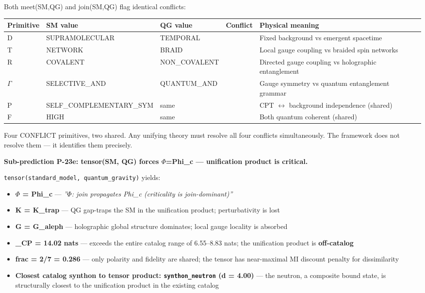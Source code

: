 \documentclass[12pt,a4paper]{article}
\begin{document}
Both meet(SM,QG) and join(SM,QG) flag identical conflicts:

\begin{table}[htbp]
\centering
\small
{}
\begin{tabularx}{\textwidth}{>{\centering\arraybackslash}X >{\centering\arraybackslash}X >{\centering\arraybackslash}X >{\centering\arraybackslash}X >{\centering\arraybackslash}X}
\toprule
\rowcolor{gray!25}\textbf{Primitive} & \textbf{SM value} & \textbf{QG value} & \textbf{Conflict} & \textbf{Physical meaning} \\
\midrule
\rowcolors{1}{white}{gray!10}
D & SUPRAMOLECULAR & TEMPORAL &  & Fixed background vs emergent spacetime \\
T & NETWORK & BRAID &  & Local gauge coupling vs braided spin networks \\
R & COVALENT & NON\_COVALENT &  & Directed gauge coupling vs holographic entanglement \\
$\Gamma$ & SELECTIVE\_AND & QUANTUM\_AND &  & Gauge symmetry vs quantum entanglement grammar \\
P & SELF\_COMPLEMENTARY\_SYM & same &  & CPT $\leftrightarrow$ background independence (shared) \\
F & HIGH & same &  & Both quantum coherent (shared) \\
\bottomrule
\end{tabularx}
\end{table}

Four CONFLICT primitives, two shared. Any unifying theory must resolve all four conflicts simultaneously. The framework does not resolve them --- it identifies them precisely.

\textbf{Sub-prediction P-23e: tensor(SM, QG) forces $\Phi$=Phi\_c --- unification product is critical.}

\texttt{tensor(standard\_model, quantum\_gravity)} yields:

\begin{itemize}
    \item \textbf{$\Phi$ = Phi\_c} --- \emph{''$\Phi$: join propagates Phi\_c (criticality is join-dominant)''}
    \item \textbf{K = K\_trap} --- QG gap-traps the SM in the unification product; perturbativity is lost
    \item \textbf{G = G\_aleph} --- holographic global structure dominates; local gauge locality is absorbed
    \item \textbf{\xi\_CP = 14.02 nats} --- exceeds the entire catalog range of 6.55--8.83 nats; the unification product is \textbf{off-catalog}
    \item \textbf{frac = 2/7 = 0.286} --- only polarity and fidelity are shared; the tensor has near-maximal MI discount penalty for dissimilarity
    \item \textbf{Closest catalog synthon to tensor product: \texttt{synthon\_neutron} (d = 4.00)} --- the neutron, a composite bound state, is structurally closest to the unification product in the existing catalog
\end{itemize}
\end{document}
